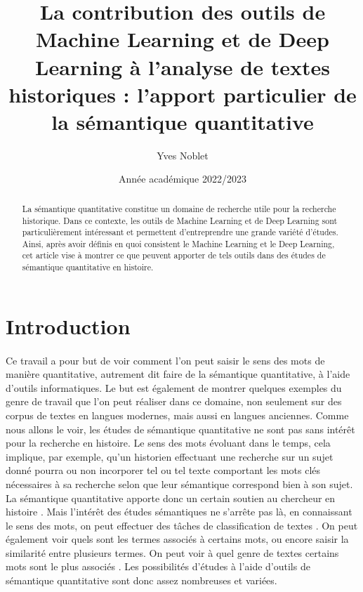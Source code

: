 \documentclass{article}
\title{La contribution des outils de Machine Learning et de Deep Learning à l’analyse de textes historiques : l'apport particulier de la sémantique quantitative}
\author{Yves Noblet}
\date{Année académique 2022/2023}
\begin{document}
\maketitle
\begin{abstract}
    La sémantique quantitative constitue un domaine de recherche utile pour la recherche historique. Dans ce contexte, les outils de Machine Learning et de Deep Learning sont particulièrement intéressant et permettent d'entreprendre une grande variété d'études. Ainsi, après avoir définis en quoi consistent le Machine Learning et le Deep Learning, cet article vise à montrer ce que peuvent apporter de tels outils dans des études de sémantique quantitative en histoire. 
\end{abstract}
\section{Introduction}
\paragraph{}
Ce travail a pour but de voir comment l’on peut saisir le sens des mots de manière quantitative, autrement dit faire de la sémantique quantitative, à l’aide d’outils informatiques. Le but est également de montrer quelques exemples du genre de travail que l’on peut réaliser dans ce domaine, non seulement sur des corpus de textes en langues modernes, mais aussi en langues anciennes. Comme nous allons le voir, les études de sémantique quantitative ne sont pas sans intérêt pour la recherche en histoire. Le sens des mots évoluant dans le temps, cela implique, par exemple, qu’un historien effectuant une recherche sur un sujet donné pourra ou non incorporer tel ou tel texte comportant les mots clés nécessaires à sa recherche selon que leur sémantique correspond bien à son sujet. La sémantique quantitative apporte donc un certain soutien au chercheur en histoire \cite[p. 1]{liebeskind2020deep}. Mais l’intérêt des études sémantiques ne s’arrête pas là, en connaissant le sens des mots, on peut effectuer des tâches de classification de textes \cite[p. 1]{liebeskind2020deep}. On peut également voir quels sont les termes associés à certains mots, ou encore saisir la similarité entre plusieurs termes. On peut voir à quel genre de textes certains mots sont le plus associés \cite[p. 1]{perrone2019gasc}. Les possibilités d’études à l’aide d’outils de sémantique quantitative sont donc assez nombreuses et variées. 
\end{document}
